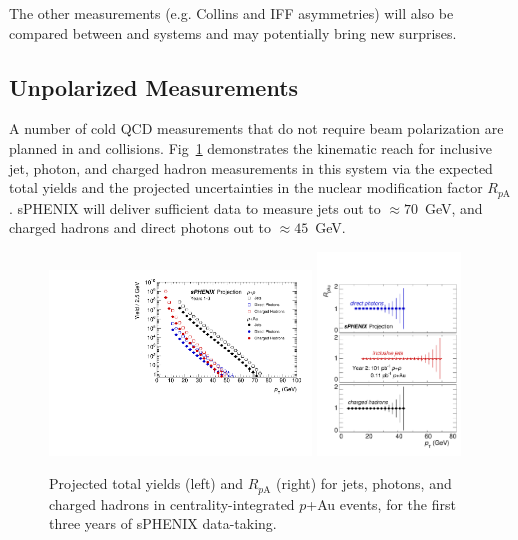 The other measurements (e.g. Collins and IFF asymmetries) will also be
compared between \pp and \pA systems and may potentially bring new
surprises. 


\subsection {Unpolarized Measurements}

A number of cold QCD measurements that do not require beam
polarization are planned in \pp and \pA collisions. Fig~\ref{fig:jet_RpA_proj} demonstrates the kinematic reach for inclusive jet, photon, and charged hadron measurements in this system via the expected total yields and the projected uncertainties in the nuclear modification factor $R_{p\mathrm{A}}$. sPHENIX will deliver sufficient data to measure jets out to $\approx 70$~GeV, and charged hadrons and direct photons out to $\approx 45$~GeV.

\begin{figure}[t]
\centering
\includegraphics[width=0.62\textwidth]{figs/master_Years13_pA_yields.pdf}
\includegraphics[width=0.34\textwidth]{figs/RpA.pdf}
\caption{Projected total yields (left) and $R_{p\mathrm{A}}$ (right) for jets, photons, and charged hadrons in centrality-integrated $p$+Au events, for the first three years of sPHENIX data-taking.}
\label{fig:jet_RpA_proj}
\end{figure}

